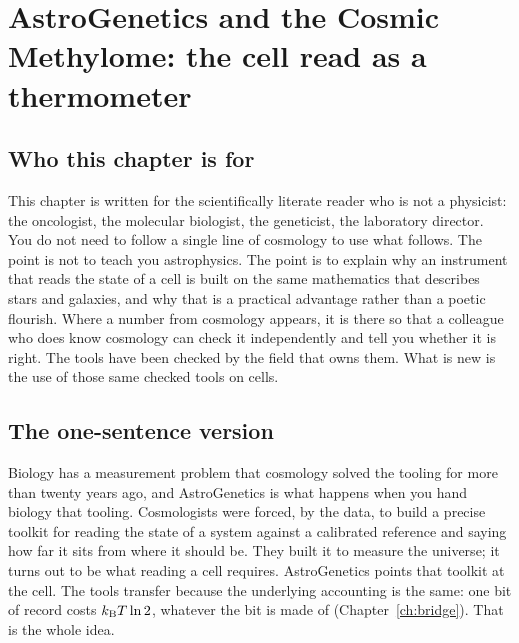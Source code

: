\chapter{AstroGenetics and the Cosmic Methylome: the cell read as a thermometer}\label{ch:astrogenetics}

\section{Who this chapter is for}\label{sec:ag_who}

This chapter is written for the scientifically literate reader who is not a physicist: the oncologist, the molecular biologist, the
geneticist, the laboratory director. You do not need to follow a single line of cosmology to use what follows. The point is not to teach
you astrophysics. The point is to explain why an instrument that reads the state of a cell is built on the same mathematics that
describes stars and galaxies, and why that is a practical advantage rather than a poetic flourish. Where a number from cosmology appears, it
is there so that a colleague who does know cosmology can check it independently and tell you whether it is right. The tools have been
checked by the field that owns them. What is new is the use of those same checked tools on cells.

\section{The one-sentence version}\label{sec:ag_one}

Biology has a measurement problem that cosmology solved the tooling for more than twenty years ago, and AstroGenetics is what happens
when you hand biology that tooling. Cosmologists were forced, by the data, to build a precise toolkit for reading the state of a system
against a calibrated reference and saying how far it sits from where it should be. They built it to measure the universe; it turns out to
be what reading a cell requires. AstroGenetics points that toolkit at the cell. The tools transfer because the underlying accounting is
the same: one bit of record costs $k_{\mathrm B} T\ln2$, whatever the bit is made of (Chapter~\ref{ch:bridge}). \derived{} That is the whole idea.
\interp

